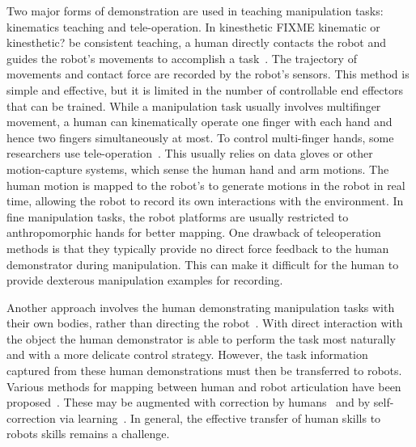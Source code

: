 Two major forms of demonstration are used in teaching manipulation
tasks: kinematics teaching and tele-operation. In kinesthetic FIXME
kinematic or kinesthetic?  be consistent %
teaching, a human directly contacts the robot and guides the robot's
movements to accomplish a
task~\citep{korkinof2013online,pais2014encoding,pastor2011skill,Miao2014}. The
trajectory of movements and contact force are recorded by the robot's
sensors.
This method is simple and effective, but it is limited in the number
of controllable end effectors that can be
trained. %
While a manipulation task usually involves multifinger movement, a
human can kinematically operate one finger with each hand and hence
two fingers simultaneously at most. To control multi-finger hands,
some researchers use
tele-operation~\citep{bernardino2013precision,kondo2008recognition,Fischer98}. This
usually relies on data gloves or other motion-capture systems, which
sense the human hand and arm motions. The human motion is mapped to
the robot's to generate motions in the robot in real time, allowing
the robot to record its own interactions with the
environment. %
In fine manipulation tasks, the robot platforms are usually restricted
to anthropomorphic hands for better mapping. One drawback of
teleoperation methods is that they typically provide no direct force
feedback to the human demonstrator during manipulation.  This can make
it difficult for the human to provide dexterous manipulation examples
for recording.

Another approach involves the human demonstrating manipulation tasks
with their own bodies, rather than directing the
robot~\citep{asfour2008imitation}. With direct interaction with the
object the human demonstrator is able to perform the task most
naturally and with a more delicate control strategy. However, the task
information captured from these human demonstrations must then be
transferred to robots. Various methods for mapping between human and
robot articulation have been
proposed~\citep{hueser2006learning,asfour2008imitation,do2011towards,}. These
may be augmented with 
correction by humans~\citep{calinon2007incremental,sauser2011iterative,romano2011human}
and by self-correction via learning~\citep{bidan2013robio}.%
In general, the effective transfer of human skills to robots skills
remains a challenge.

